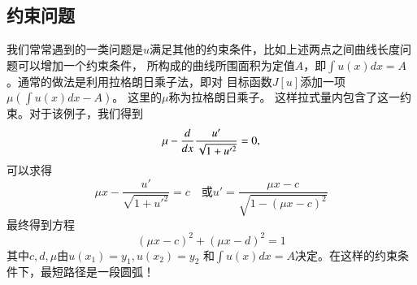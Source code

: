 \subsection{约束问题}
我们常常遇到的一类问题是$u$满足其他的约束条件，比如上述两点之间曲线长度问题可以增加一个约束条件，
所构成的曲线所围面积为定值$A$，即$\int u(x) dx = A$。通常的做法是利用拉格朗日乘子法，即对
目标函数$J[u]$添加一项$\mu\left( \int u(x) dx - A \right)$。 这里的$\mu$称为拉格朗日乘子。
这样拉式量内包含了这一约束。对于该例子，我们得到
\[
  \mu - \frac{d{}}{d{x}} \frac{u'}{\sqrt{1 + u'^2}} = 0,
\]
可以求得
\[
  \mu x-\frac{u'}{\sqrt{1+u'^2}}=c \quad \textrm{或} u'=\frac{\mu x-c}{\sqrt{1-(\mu x-c)^2}}
 \]
最终得到方程
\[
  (\mu x - c)^2 + (\mu x -d)^2 = 1
\]
其中$c,d,\mu$由$u(x_1)=y_1, u(x_2) = y_2$ 和$\int u(x) dx = A$决定。在这样的约束条件下，最短路径是一段圆弧！

